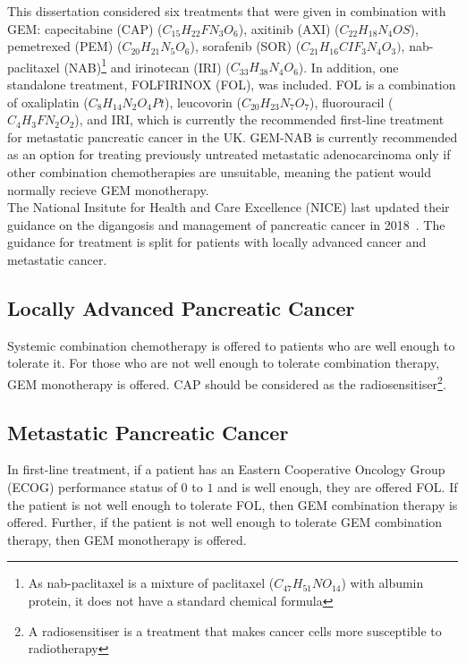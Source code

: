 This dissertation considered six treatments that were given in combination with GEM: capecitabine (CAP) ($C_{15}H_{22}FN_3O_6$), axitinib (AXI) ($C_{22}H_{18}N_4OS$), pemetrexed (PEM) ($C_{20}H_{21}N_5O_6$), sorafenib (SOR) ($C_{21}H_{16}CIF_{3}N_4O_3)$, nab-paclitaxel (NAB)\footnote{As nab-paclitaxel is a mixture of paclitaxel ($C_{47}H_{51}NO_{14}$) with albumin protein, it does not have a standard chemical formula} and irinotecan (IRI) ($C_{33}H_{38}N_4O_6$). In addition, one standalone treatment, FOLFIRINOX (FOL), was included. FOL is a combination of oxaliplatin ($C_{8}H_{14}N_{2}O_{4}Pt$), leucovorin ($C_{20}H_{23}N_{7}O_{7}$), fluorouracil ($C_{4}H_{3}FN_{2}O_{2}$), and IRI, which is currently the recommended first-line treatment for metastatic pancreatic cancer in the UK. GEM-NAB is currently recommended as an option for treating previously untreated metastatic adenocarcinoma only if other combination chemotherapies are unsuitable, meaning the patient would normally recieve GEM monotherapy.\\

The National Insitute for Health and Care Excellence (NICE) last updated their guidance on the digangosis and management of pancreatic cancer in 2018~\cite{NG85}. The guidance for treatment is split for patients with locally advanced cancer and metastatic cancer. 

\subsection{Locally Advanced Pancreatic Cancer}
Systemic combination chemotherapy is offered to patients who are well enough to tolerate it. For those who are not well enough to tolerate combination therapy, GEM monotherapy is offered. CAP should be considered as the radiosensitiser\footnote{A radiosensitiser is a treatment that makes cancer cells more susceptible to radiotherapy}.

\subsection{Metastatic Pancreatic Cancer}
In first-line treatment, if a patient has an Eastern Cooperative Oncology Group (ECOG) performance status of $0$ to $1$ and is well enough, they are offered FOL. If the patient is not well enough to tolerate FOL, then GEM combination therapy is offered. Further, if the patient is not well enough to tolerate GEM combination therapy, then GEM monotherapy is offered.  \\

